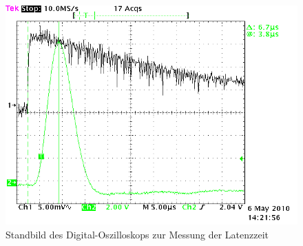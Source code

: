 \begin{figure}[htb]
      \centering
      \includegraphics[width=1\columnwidth,keepaspectratio]{messverzoegerung}
      \caption{Standbild des Digital-Oszilloskops zur Messung der Latenzzeit}
      \label{fig:latenz}
\end{figure}

